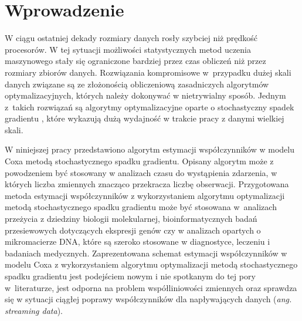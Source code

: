 \chapter*{Wprowadzenie}
\vspace{-20pt}
W ciągu ostatniej dekady rozmiary danych rosły szybciej niż prędkość procesorów. W tej sytuacji możliwości statystycznych metod uczenia maszynowego stały się ograniczone bardziej przez czas obliczeń niż przez rozmiary zbiorów danych. Rozwiązania kompromisowe w~przypadku dużej skali danych związane są ze złożonością obliczeniową zasadniczych algorytmów optymalizacyjnych, których należy dokonywać w nietrywialny sposób. Jednym z~takich rozwiązań są algorytmy optymalizacyjne oparte o stochastyczny spadek gradientu \citep{bott1, bott2, widrow2}, które wykazują dużą wydajność w trakcie pracy z danymi wielkiej skali.

W niniejszej pracy przedstawiono algorytm estymacji współczynników w modelu Coxa metodą stochastycznego spadku gradientu. Opisany algorytm może z powodzeniem być stosowany w analizach czasu do wystąpienia zdarzenia, w których liczba zmiennych znacząco przekracza liczbę obserwacji. Przygotowana metoda estymacji współczynników z wykorzystaniem algorytmu optymalizacji metodą stochastycznego spadku gradientu może być stosowana w~analizach przeżycia z dziedziny biologii molekularnej, bioinformatycznych badań przesiewowych dotyczących ekspresji genów czy w analizach opartych o mikromacierze DNA, które są szeroko stosowane w diagnostyce, leczeniu i badaniach medycznych. Zaprezentowana schemat estymacji współczynników w modelu Coxa z wykorzystaniem algorytmu optymalizacji metodą stochastycznego spadku gradientu jest podejściem nowym i nie spotkanym do tej pory w~literaturze, jest odporna na problem współliniowości zmiennych oraz sprawdza się w sytuacji ciągłej poprawy współczynników dla napływających danych (\textit{ang. streaming data}).

